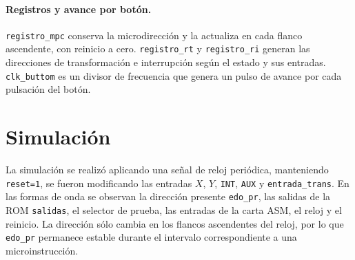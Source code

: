 \documentclass[letterpaper,12pt]{article}
\begin{document}








\paragraph{Registros y avance por botón.} \texttt{registro\_mpc} conserva la microdirección y la actualiza en cada flanco ascendente, con reinicio a cero. \texttt{registro\_rt} y \texttt{registro\_ri} generan las direcciones de transformación e interrupción según el estado y sus entradas. \texttt{clk\_buttom} es un divisor de frecuencia que genera un pulso de avance por cada pulsación del botón.









\section{Simulación}

La simulación se realizó aplicando una señal de reloj periódica, manteniendo
\texttt{reset=1}, se fueron modificando las entradas $X$, $Y$,
\texttt{INT}, \texttt{AUX} y \texttt{entrada\_trans}. En las formas de onda se
observan la dirección presente \texttt{edo\_pr}, las salidas de la ROM
\texttt{salidas}, el selector de prueba, las entradas de la carta ASM, el reloj y
el reinicio. La dirección sólo cambia en los flancos ascendentes del reloj, por lo que \texttt{edo\_pr} permanece estable durante el intervalo
correspondiente a una microinstrucción.
\end{document}
